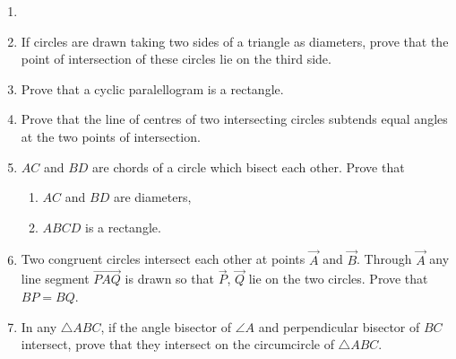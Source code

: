 \begin{enumerate}[label=\thesection.\arabic*,ref=\thesection.\theenumi]
\item 
\label{chapters/9/10/5/3}

\item If circles are drawn taking two sides of a triangle as diameters, prove that the point of intersection of these circles lie on the third side.
\label{chapters/9/10/5/10}
\\
\solution

    \item Prove that a cyclic paralellogram is a rectangle.
\label{chapters/9/10/5/12}
\\
\solution

\item Prove that the line of centres of two intersecting circles subtends equal angles at the two points of intersection.
\\
    \solution 
\label{chapters/9/10/6/1}

\item  $AC$ and $BD$ are chords of a circle which bisect each other. Prove that 
	\begin{enumerate}
		\item  $AC$ and $BD$ are diameters, 
		\item  $ABCD$ is a rectangle.
	\end{enumerate}
    \solution 
\label{chapters/9/10/6/7}

\item Two congruent circles intersect each other at points $\vec{A}$ and $\vec{B}$. Through $\vec{A}$ any line segment $\vec{PAQ}$ is drawn so that $\vec{P}$, $\vec{Q}$ lie on the two circles. Prove that $BP = BQ$.
\label{chapters/9/10/6/9}
\\
    \solution 

\item In any $\triangle ABC$, if the angle bisector of $\angle A$ and 
    perpendicular bisector of $BC$ intersect, prove that they intersect on 
    the circumcircle of $\triangle ABC$.
\\
    \solution 
\label{chapters/9/10/6/10}



\end{enumerate}

